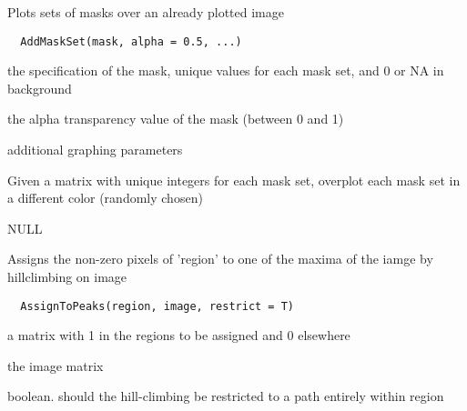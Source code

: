 \documentclass[a4paper]{book}
\begin{document}
%
\begin{Description}\relax
Plots sets of masks over an already plotted image
\end{Description}
%
\begin{Usage}
\begin{verbatim}
  AddMaskSet(mask, alpha = 0.5, ...)
\end{verbatim}
\end{Usage}
%
\begin{Arguments}
\begin{ldescription}
\item[\code{mask}] the specification of the mask, unique values
for each mask set, and 0 or NA in background

\item[\code{alpha}] the alpha transparency value of the mask
(between 0 and 1)

\item[\code{...}] additional graphing parameters
\end{ldescription}
\end{Arguments}
%
\begin{Details}\relax
Given a matrix with unique integers for each mask set,
overplot each mask set in a different color (randomly
chosen)
\end{Details}
%
\begin{Value}
NULL
\end{Value}
%
\begin{Description}\relax
Assigns the non-zero pixels of 'region' to one of the
maxima of the iamge by hillclimbing on image
\end{Description}
%
\begin{Usage}
\begin{verbatim}
  AssignToPeaks(region, image, restrict = T)
\end{verbatim}
\end{Usage}
%
\begin{Arguments}
\begin{ldescription}
\item[\code{region}] a matrix with 1 in the regions to be
assigned and 0 elsewhere

\item[\code{image}] the image matrix

\item[\code{restrict}] boolean.  should the hill-climbing be
restricted to a path entirely within region
\end{ldescription}
\end{Arguments}
\end{document}
